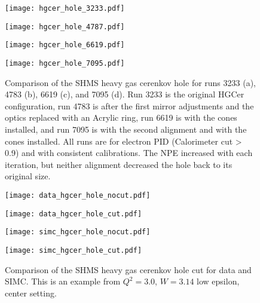 \begin{figure}
  \centering
  \begin{minipage}[b]{0.48\linewidth}
    \texttt{[image: hgcer\_hole\_3233.pdf]}
  \end{minipage}
  \hfill
  \begin{minipage}[b]{0.48\linewidth}
    \texttt{[image: hgcer\_hole\_4787.pdf]}
  \end{minipage}
  
  \vspace{0.5cm}
  
  \begin{minipage}[b]{0.48\linewidth}
    \texttt{[image: hgcer\_hole\_6619.pdf]}
  \end{minipage}
  \hfill
  \begin{minipage}[b]{0.48\linewidth}
    \texttt{[image: hgcer\_hole\_7095.pdf]}
  \end{minipage}
  
  \caption{Comparison of the SHMS heavy gas cerenkov hole for runs 3233 (a), 4783 (b), 6619 (c), and 7095 (d). Run 3233 is the original HGCer configuration, run 4783 is after the first mirror adjustments and the optics replaced with an Acrylic ring, run 6619 is with the cones installed, and run 7095 is with the second alignment and with the cones installed. All runs are for electron PID (Calorimeter cut > 0.9) and with consistent calibrations. The NPE increased with each iteration, but neither alignment decreased the hole back to its original size.}
  \label{fig:3-3_hgcer_hole}
\end{figure}

\begin{figure}
  \centering
  \begin{minipage}[b]{0.48\linewidth}
    \texttt{[image: data\_hgcer\_hole\_nocut.pdf]}
  \end{minipage}
  \hfill
  \begin{minipage}[b]{0.48\linewidth}
    \texttt{[image: data\_hgcer\_hole\_cut.pdf]}
  \end{minipage}
  
  \vspace{0.5cm}
  
  \begin{minipage}[b]{0.48\linewidth}
    \texttt{[image: simc\_hgcer\_hole\_nocut.pdf]}
  \end{minipage}
  \hfill
  \begin{minipage}[b]{0.48\linewidth}
    \texttt{[image: simc\_hgcer\_hole\_cut.pdf]}
  \end{minipage}
  
  \caption{Comparison of the SHMS heavy gas cerenkov hole cut for data and SIMC. This is an example from $Q^2=3.0$, $W=3.14$ low epsilon, center setting.}
  \label{fig:3-3_hgcer_hole_cut}
\end{figure}

